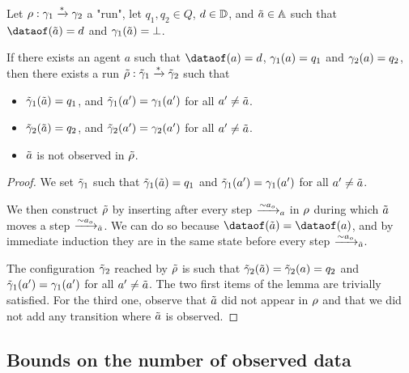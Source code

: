 \begin{lemma}
	\label{lem:agents-copycat}
	Let  $\run : \config_1 \xrightarrow{*} \config_2$ a "run", let $q_1, q_2 \in Q$,  $d \in \Dataset$, and  $\Tilde{a} \in \Agentset$ such that $\dataof(\Tilde{a}) = d$ and $\config_1(\Tilde{a}) = \bot$. 
	
	If there exists an agent $a$ such that $\dataof(a)=d$, $\config_1(a) = q_1$ and $\config_2(a) = q_2$, then there exists a run $\Tilde{\run} : \Tilde{\config}_1 \xrightarrow{*} \Tilde{\config}_2$ such that
	\begin{itemize}
		\item $\Tilde{\config}_1(\Tilde{a}) = q_1$, and $\Tilde{\config}_1(a') = \config_1(a')$ for all $a' \neq \Tilde{a}$.
		
		\item $\Tilde{\config}_2(\Tilde{a}) = q_2$, and $\Tilde{\config}_2(a') = \config_2(a')$ for all $a' \neq \Tilde{a}$.
		
		\item $\Tilde{a}$ is not observed in $\Tilde{\run}$.
	\end{itemize}
\end{lemma}

\begin{proof}
	We set $\Tilde{\config}_1$ such that $\Tilde{\config}_1(\Tilde{a}) = q_1$ and $\Tilde{\config}_1(a') = \config_1(a')$ for all $a' \neq \Tilde{a}$.
	
	We then construct $\Tilde{\run}$ by inserting after every step $\step{\sim}{a}{a_o}$ in $\run$ during which $\Tilde{a}$ moves a step
	$\step{\sim}{\Tilde{a}}{a_o}$.
	We can do so because $\dataof(\Tilde{a})=\dataof(a)$, and by immediate induction they are in the same state before every step $\step{\sim}{\Tilde{a}}{a_o}$.
	
	The configuration $\Tilde{\config}_2$ reached by $\Tilde{\run}$ is such that $\Tilde{\config}_2(\Tilde{a}) = \Tilde{\config}_2(a) = q_2$ and $\Tilde{\config}_1(a') = \config_1(a')$ for all $a' \neq \Tilde{a}$. The two first items of the lemma are trivially satisfied.
	For the third one, observe that $\Tilde{a}$ did not appear in $\run$ and that we did not add any transition where $\Tilde{a}$ is observed.
\end{proof}


\subsection{Bounds on the number of observed data}

